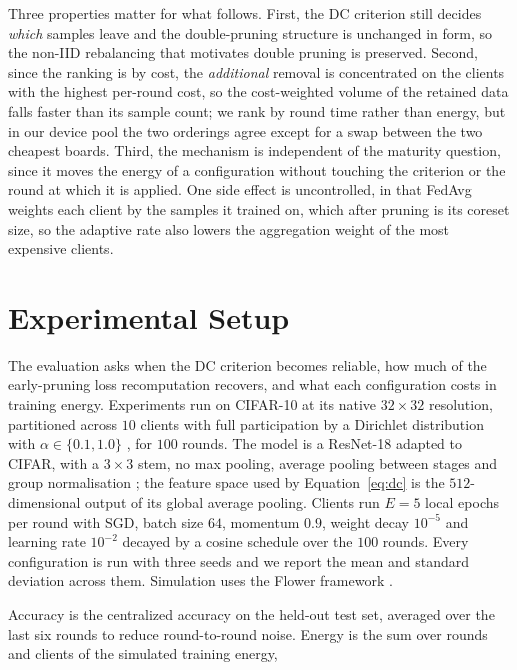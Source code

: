 \documentclass[conference]{IEEEtran}
\begin{document}
Three properties matter for what follows. First, the DC criterion still decides
\emph{which} samples leave and the double-pruning structure is unchanged in form, so the
non-IID rebalancing that motivates double pruning is preserved. Second, since the
ranking is by cost, the \emph{additional} removal is concentrated on the clients with
the highest per-round cost, so the cost-weighted volume of the retained data falls
faster than its sample count; we rank by round time rather than energy, but in our
device pool the two orderings agree except for a swap between the two cheapest boards.
Third, the mechanism is independent of the maturity question, since it moves the energy
of a configuration without touching the criterion or the round at which it is applied.
One side effect is uncontrolled, in that FedAvg weights each client by the samples it
trained on, which after pruning is its coreset size, so the adaptive rate also lowers the
aggregation weight of the most expensive clients.

\section{Experimental Setup}\label{sec:setup}

The evaluation asks when the DC criterion becomes reliable, how much of the
early-pruning loss recomputation recovers, and what each configuration costs in
training energy. Experiments run on CIFAR-10 \cite{cifar} at its native $32\times32$ resolution,
partitioned across $10$ clients with full participation by a Dirichlet distribution
with $\alpha \in \{0.1, 1.0\}$ \cite{dirichlet}, for $100$ rounds. The model is a
ResNet-18 \cite{resnet} adapted to CIFAR, with a $3\times3$ stem, no max pooling,
average pooling between stages and group normalisation \cite{gn}; the feature space
used by Equation~\eqref{eq:dc} is the $512$-dimensional output of its global average
pooling. Clients run $E = 5$ local epochs per round with SGD, batch size $64$,
momentum $0.9$, weight decay $10^{-5}$ and learning rate $10^{-2}$ decayed by a
cosine schedule over the $100$ rounds. Every configuration is run with three seeds
and we report the mean and standard deviation across them. Simulation uses the Flower
framework \cite{flower}.

Accuracy is the centralized accuracy on the held-out test set, averaged over the last
six rounds to reduce round-to-round noise. Energy is the sum over rounds and clients
of the simulated training energy,
\end{document}
